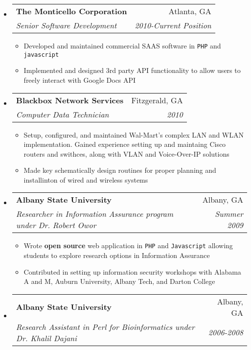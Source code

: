 \documentclass[letterpaper,11pt]{article}
\makeatletter
\newcommand{\resitem}[1]{\item #1 \vspace{-2pt}}
\newcommand{\ressubheading}[4]{

\begin{tabular*}{6.5in}{l@{\cftdotfill{\cftsecdotsep}\extracolsep{\fill}}r}

		\textbf{#1} & #2 \\

		\textit{#3} & \textit{#4} \\

\end{tabular*}\vspace{-6pt}}
\makeatother
\begin{document}
\begin{itemize}

\item

	\ressubheading{The Monticello Corporation}{Atlanta, GA}{Senior Software Development}{2010-Current Position}

	\begin{itemize}

		\resitem{Developed and maintained commercial SAAS software in \texttt{PHP} and \texttt{javascript}}

    \resitem{Implemented and designed 3rd party API functionality to allow users to freely interact with Google Docs API}

	\end{itemize}

\item

	\ressubheading{Blackbox Network Services}{Fitzgerald, GA}{Computer Data Technician}{2010}

	\begin{itemize}

		\resitem{Setup, configured, and maintained Wal-Mart's complex LAN and WLAN implementation.  Gained experience setting up and maintaing Cisco routers and swithces, along with VLAN and Voice-Over-IP solutions}

    \resitem{Made key schematically design routines for proper planning and installinton of wired and wireless systems}

	\end{itemize}

\item 

	\ressubheading{Albany State University}{Albany, GA}{Researcher in Information Assurance program under Dr. Robert Owor}{Summer 2009}

	\begin{itemize}

		\resitem{Wrote \textbf{open source} web application in \texttt{PHP} and \texttt{Javascript} allowing students to explore research options in Information Assurance}

    \resitem{Contributed in setting up information security workshops with Alabama A and M, Auburn University, Albany Tech, and Darton College}

	\end{itemize}

\item

	\ressubheading{Albany State University}{Albany, GA}{Research Assistant in Perl for Bioinformatics under Dr. Khalil Dajani}{2006-2008}


\end{itemize}
\end{document}
